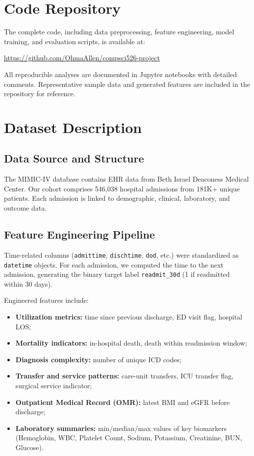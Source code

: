 \documentclass[runningheads]{llncs}
\begin{document}
\section{Code Repository}

The complete code, including data preprocessing, feature engineering, model training, and evaluation scripts, is available at:
\begin{center}
\url{https://github.com/OhmaAllen/compsci526-project}
\end{center}
All reproducible analyses are documented in Jupyter notebooks with detailed comments. Representative sample data and generated features are included in the repository for reference.

\section{Dataset Description}

\subsection{Data Source and Structure}
The MIMIC-IV database contains EHR data from Beth Israel Deaconess Medical Center. Our cohort comprises 546,038 hospital admissions from 181K+ unique patients. Each admission is linked to demographic, clinical, laboratory, and outcome data.

\subsection{Feature Engineering Pipeline}
Time-related columns (\texttt{admittime}, \texttt{dischtime}, \texttt{dod}, etc.) were standardized as \texttt{datetime} objects. For each admission, we computed the time to the next admission, generating the binary target label \texttt{readmit\_30d} (1 if readmitted within 30 days).

Engineered features include:
\begin{itemize}
    \item \textbf{Utilization metrics:} time since previous discharge, ED visit flag, hospital LOS;
    \item \textbf{Mortality indicators:} in-hospital death, death within readmission window;
    \item \textbf{Diagnosis complexity:} number of unique ICD codes;
    \item \textbf{Transfer and service patterns:} care-unit transfers, ICU transfer flag, surgical service indicator;
    \item \textbf{Outpatient Medical Record (OMR):} latest BMI and eGFR before discharge;
    \item \textbf{Laboratory summaries:} min/median/max values of key biomarkers (Hemoglobin, WBC, Platelet Count, Sodium, Potassium, Creatinine, BUN, Glucose).
\end{itemize}
\end{document}
